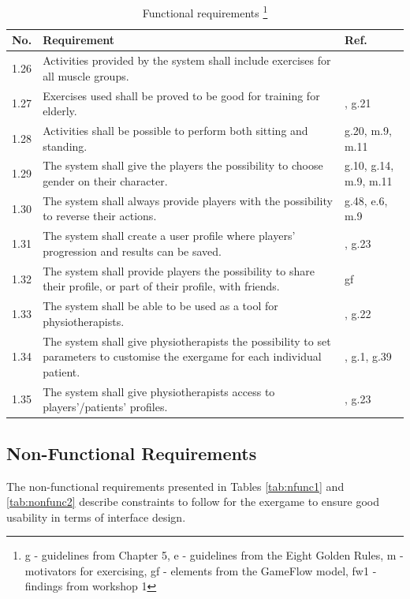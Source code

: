 \begin{minipage}{12 cm}
\begin{table} [H]
\centering
\begin{tabular}{|>{\raggedright}p{}|p{}|p{}|}
\hline
\textbf{No.} & \textbf{Requirement} & \textbf{Ref.} \\ \hline
1.26 & Activities provided by the system shall include exercises for all muscle groups. & \cite{aktivitetsbok} \\ \hline
1.27 & Exercises used shall be proved to be good for training for elderly. & \cite{project}, g.21 \\ \hline
1.28 & Activities shall be possible to perform both sitting and standing. & g.20, m.9, m.11 \\ \hline
1.29 & The system shall give the players the possibility to choose gender on their character. &  g.10, g.14, m.9, m.11 \\ \hline
1.30 & The system shall always provide players with the possibility to reverse their actions. & g.48, e.6, m.9 \\ \hline
1.31 & The system shall create a user profile where players' progression and results can be saved. & \cite{project}, g.23 \\ \hline
1.32 & The system shall provide players the possibility to share their profile, or part of their profile, with friends. &  gf \\ \hline
1.33 & The system shall be able to be used as a tool for physiotherapists. & \cite{project}, g.22 \\ \hline
1.34 & The system shall give physiotherapists the possibility to set parameters to customise the exergame for each individual patient. & \cite{project}, g.1, g.39  \\ \hline
1.35 & The system shall give physiotherapists access to players'/patients' profiles. & \cite{project}, g.23\\ \hline  
\end{tabular}
\caption[Functional requirements, part 3]{Functional requirements \footnote{g - guidelines from Chapter 5, e - guidelines from the Eight Golden Rules, m - motivators for exercising, gf - elements from the GameFlow model, fw1 - findings from workshop 1}}
\label{tab:func3}
\end{table} 
\end{minipage}

\subsection{Non-Functional Requirements}
The non-functional requirements presented in Tables \ref{tab:nfunc1} and \ref{tab:nonfunc2} describe constraints to follow for the exergame to ensure good usability in terms of interface design.

